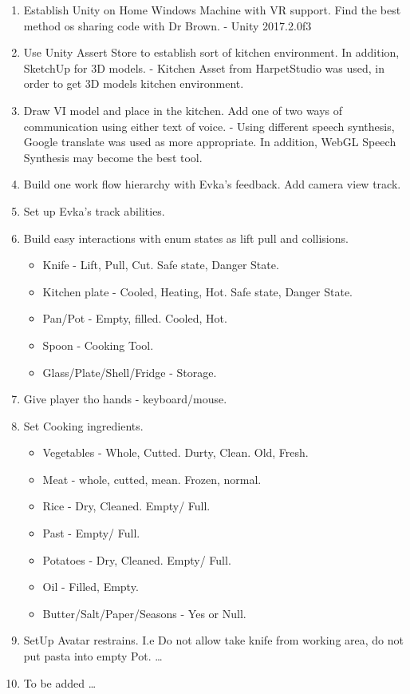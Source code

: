 \documentclass[18pt]{article}
\numberwithin{equation}{section} %
\numberwithin{figure}{section} %
\numberwithin{table}{section} %
\begin{document}
	\begin{enumerate}
		\item Establish Unity on Home Windows Machine with VR support. Find the best method os sharing code with Dr Brown. - Unity 2017.2.0f3
		\item Use Unity Assert Store to establish sort of kitchen environment. In addition, SketchUp for 3D models. -   Kitchen Asset from HarpetStudio was used, in order to get 3D models kitchen environment.
		\item Draw VI model and place in the kitchen. Add one of two ways of communication using either text of voice. - Using different speech synthesis, Google translate was used as more appropriate. In addition, WebGL Speech Synthesis may become the best tool.
		\item Build one work flow hierarchy with Evka's feedback. Add camera view track.
		\item Set up Evka's track abilities.
		\item Build easy interactions with enum states as lift pull and collisions.
		\begin{itemize}
			\item Knife - Lift, Pull, Cut. Safe state, Danger State.
			\item Kitchen plate - Cooled, Heating, Hot. Safe state, Danger State.
			\item Pan/Pot - Empty, filled. Cooled, Hot.
			\item Spoon - Cooking Tool.
			\item Glass/Plate/Shell/Fridge - Storage.
		\end{itemize}
		\item Give player tho hands - keyboard/mouse.
		\item Set Cooking ingredients.
		\begin{itemize}
			\item Vegetables - Whole, Cutted. Durty, Clean. Old, Fresh.
			\item Meat - whole, cutted, mean. Frozen, normal.
			\item Rice - Dry, Cleaned. Empty/ Full.
			\item Past - Empty/ Full.
			\item Potatoes - Dry, Cleaned. Empty/ Full.
			\item Oil - Filled, Empty.
			\item Butter/Salt/Paper/Seasons - Yes or Null.
		\end{itemize}
		\item SetUp Avatar restrains. I.e Do not allow take knife from working area, do not put pasta into empty Pot. \ldots
		\item To be added \ldots
		
	\end{enumerate}
	
\end{document}
